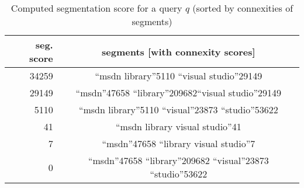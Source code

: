 \begin{table}[t]
 \caption{Computed segmentation score for a query $q$ (sorted by connexities of segments)}
 \label{table-connexity-score-risvik-2003}
 \centering
 \small
 \begin{tabular}{@{}rc@{}}
  \toprule
  seg. score & segments [with connexity scores] \\
  \midrule
  34259      & ``msdn library''{\tiny 5110} ``visual studio''{\tiny 29149}\\
  29149      & ``msdn''{\tiny 47658} ``library''{\tiny 209682}``visual studio''{\tiny 29149}\\
  5110       & ``msdn library''{\tiny 5110} ``visual''{\tiny 23873} ``studio''{\tiny 53622}\\
  41      	 & ``msdn library visual studio''{\tiny 41}\\
  7		     & ``msdn''{\tiny 47658} ``library visual studio''{\tiny 7}\\
  0 		     & ``msdn''{\tiny 47658} ``library''{\tiny 209682} ``visual''{\tiny 23873} ``studio''{\tiny 53622}\\
  \bottomrule
 \end{tabular}
\end{table}
